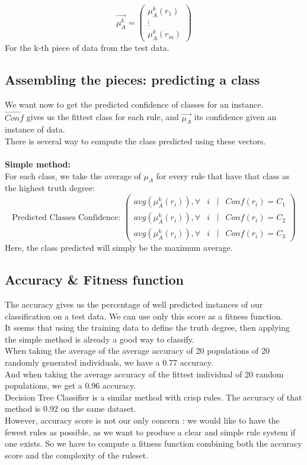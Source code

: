 \documentclass[a4paper,12pt]{article}
\begin{document}
\[
\vec{\mu_A^k}=
\begin{pmatrix}
\mu_A^k(r_1)\\
\vdots\\
\mu_A^k(r_m)
\end{pmatrix}
\]
For the k-th piece of data from the test data.

\subsection{Assembling the pieces: predicting a class}

We want now to get the predicted confidence of classes for an instance.\\
$\vec{Conf}$ gives us the fittest class for each rule, and $\vec{\mu_A}$ its confidence given an instance of data. \\
There is several way to compute the class predicted using these vectors.
\\
\\
\textbf{Simple method:}
\\
For each class, we take the average of $\mu_A$ for every rule that have that class as the highest truth degree:
\[
\text{Predicted Classes Confidence: }
\begin{pmatrix}
avg(\mu_A^k(r_i)), \forall & i & | & Conf(r_i)=C_1\\
avg(\mu_A^k(r_i)), \forall & i & | & Conf(r_i)=C_2\\
avg(\mu_A^k(r_i)), \forall & i & | & Conf(r_i)=C_3
\end{pmatrix}
\]
Here, the class predicted will simply be the maximum average.


\subsection{Accuracy \& Fitness function}

The accuracy gives us the percentage of well predicted instances of our classification on a test data. We can use only this score as a fitness function.\\
It seems that using the training data to define the truth degree, then applying the simple method is already a good way to classify.\\
When taking the average of the average accuracy of 20 populations of 20 randomly generated individuals, we have a 0.77 accuracy.\\
And when taking the average accuracy of the fittest individual of 20 random populations, we get a 0.96 accuracy.\\
Decision Tree Classifier is a similar method with crisp rules. The accuracy of that method is 0.92 on the same dataset.\\
However, accuracy score is not our only concern : we would like to have the fewest rules as possible, as we want to produce a clear and simple rule system if one exists. So we have to compute a fitness function combining both the accuracy score and the complexity of the ruleset.



\end{document}
